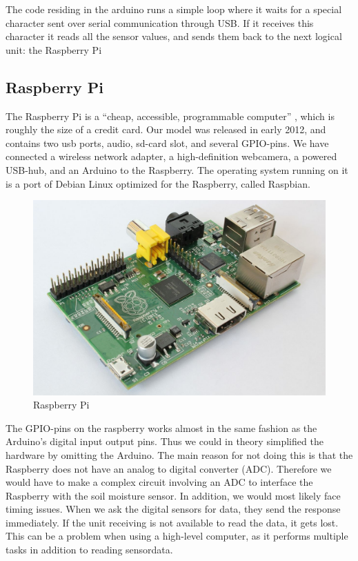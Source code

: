 The code residing in the arduino runs a simple loop where it waits for a special character sent over serial communication through USB. If it receives this character it reads all the sensor values, and sends them back to the next logical unit: the Raspberry Pi

\subsection{Raspberry Pi}
The Raspberry Pi is a “cheap, accessible, programmable computer” \citep{raspberrypi}, which is roughly the size of a credit card. Our model was released in early 2012, and contains two usb ports, audio, sd-card slot, and several GPIO-pins. We have connected a wireless network adapter, a high-definition webcamera, a powered USB-hub, and an Arduino to the Raspberry. The operating system running on it is a port of Debian Linux optimized for the Raspberry, called Raspbian. 

\begin{figure}
\centering
\includegraphics[width=1\textwidth]{img/hardware/1200px-RaspberryPi.jpg}
\caption{Raspberry Pi}
\label{fig:raspberry}
\end{figure}

The GPIO-pins on the raspberry works almost in the same fashion as the Arduino’s digital input output pins. Thus we could in theory simplified the hardware by omitting the Arduino. The main reason for not doing this is that the Raspberry does not have an analog to digital converter (ADC). Therefore we would have to make a complex circuit involving an ADC to interface the Raspberry with the soil moisture sensor. In addition, we would most likely face timing issues. When we ask the digital sensors for data, they send the response immediately. If the unit receiving is not available to read the data, it gets lost. This can be a problem when using a high-level computer, as it performs multiple tasks in addition to reading sensordata. 

